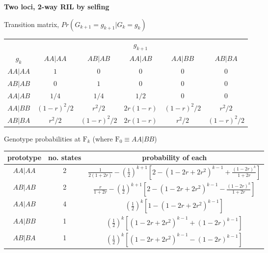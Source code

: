 \documentclass[12pt]{article}
\begin{document}
\thispagestyle{empty}



\textbf{\sffamily Two loci, 2-way RIL by selfing}
\bigskip

\bigskip \bigskip
\begin{center}
Transition matrix, $Pr(G_{k+1}=g_{k+1} | G_k = g_k)$ \\[6pt]
\renewcommand{\arraystretch}{1.5}\begin{tabular}{cccccc} \hline
& \multicolumn{5}{c}{$g_{k+1}$} \\ \cline{2-6}
$g_k$ & $AA|AA$ & $AB|AB$ & $AA|AB$ & $AA|BB$ & $AB|BA$  \\ \hline 
$AA|AA$ & $1$ & $0$ & $0$ & $0$ & $0$ \\ 
$AB|AB$ & $0$ & $1$ & $0$ & $0$ & $0$ \\ 
$AA|AB$ & $1/4$ & $1/4$ & $1/2$ & $0$ & $0$ \\ 
$AA|BB$ & $(1-r)^2/2$ & $r^2/2$ & $2r(1-r)$ & $(1-r)^2/2$ & $r^2/2$ \\ 
$AB|BA$ & $r^2/2$ & $(1-r)^2/2$ & $2r(1-r)$ & $r^2/2$ & $(1-r)^2/2$ \\ 
\hline
\end{tabular}
\end{center}

\bigskip \bigskip
\begin{center}
Genotype probabilities at $\text{F}_k$ (where $\text{F}_0 \equiv AA|BB$)\\[6pt]
\renewcommand{\arraystretch}{1.5}\begin{tabular}{ccc}\hline
prototype & no. states & probability of each \\ \hline
$AA|AA$ & 2 & $\frac{1}{2(1+2r)} - \left(\frac{1}{2}\right)^{k+1}  \left[2 - (1-2r+2r^2)^{k-1} + \frac{(1-2r)^k}{1+2r} \right]$ \\ 
$AB|AB$ & 2 & $\frac{r}{1+2r} - \left(\frac{1}{2}\right)^{k+1}  \left[2 - (1-2r+2r^2)^{k-1} - \frac{(1-2r)^k}{1+2r} \right]$ \\ 
$AA|AB$ & 4 & $\left(\frac{1}{2}\right)^k  \left[ 1 - (1-2r+2r^2)^{k-1} \right]$ \\ 
$AA|BB$ & 1 & $\left(\frac{1}{2}\right)^k  \left[ (1 - 2r + 2r^2)^{k-1} + (1-2r)^{k-1} \right]$ \\ 
$AB|BA$ & 1 & $\left(\frac{1}{2}\right)^k  \left[ (1 - 2r + 2r^2)^{k-1} - (1-2r)^{k-1} \right]$ \\ 
\hline
\end{tabular}
\end{center}
\end{document}
